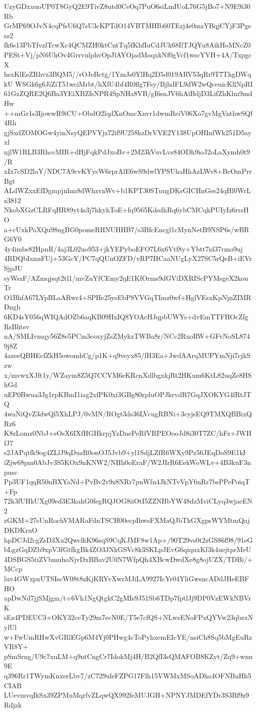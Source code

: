 UzyGDxuuoUP0T8GyQ2E9TivZ8utd0CeOq7PuO6siLmIUoL76G5jBo7+N9E9i30Rb
GrMP69OJvN4cqPfsU6Q7sU3cKPTdO14VBTMHIb60TEzj4e0mzYBqjCYjF3Pgesz2
fk6s13PbTfvzlTcwXc4QCMZH0ktCntTq5fKhfIuCdJUk68IlTJQYu8AikHoMNcZ0
PESt+Vj/pN6UhOv4GrrvulphvOpJlAYOjadMoqxkNf0gVcf1wscYVH+4A/TxpgcX
hsxKlEsZRhvz3BQM5//rOJeBctg/1YmJs0YlHq2D5d019ARV53qRr9T7ThgDWqkU
WSGk6g6JiZiT51wciMrbt/hXlU4bf4R0flg7Fsy/BjhdFL9dW2wQceuicKllNpRI
61GzZQRE2Q6Ba3YEiXBZfsNPR4SpNHa8VB/gI6snJV6hAiBdjD3LifZhKlm9mdHw
++mGr1s3IjowwR9iCU+ObdO2lqdXnOmcXnvr1dwmReiV06Xo7gvMgVnthwSQf4Rh
gjSxdZOMOGw4yinNsyQEPVYjz72if9U258kzDrVVE2Y138UpOHInfWk251D5ayxl
njlW1RLB3RhccMIR+dHjFqkPdJxoBv+2M23kVuvLvs84ODh9ioJ2oLaXymh0t9/R
xIx7cSD2laY/NDC7A9cvKYysW6rprAlE6wS9dwlYPSUhaHhAzLWv8+BcOmPrrBgt
ALdWZxxEfDgmpjnhm8dWhzvnWv+b1KPT30STuugDKsGICHnGes24qHl0WrLz3812
NkobXGzCLRFqHR89yt4s3j7hkyhToE+fq9565KdsdhRq6ybCMCqkPUIyIz6rrsHO
a+cUxkPoXQu98ngBG0pomeRHNUHHB7/s3BfcEncgl1cMynNetB9NSP6s/wBRG6Y0
4y4imbs82HpnR/4aj3L02uo953+jkYEPyboEFO7L6x6Vtf8y+Ybtt7id37rmo9uj
4RDQbIxnnFUj+53GcY/PC7qQUnOZFD/vRP7HCaaNUgLyX27SC5rQeB+iEVrSjpJU
syWszF/AZmqjsqt2tl1/mvZuYfCEmy2qE1KfOrms9dGViDXRIScPYMsgeX2kouTr
O1BhfA67LYpBLaARwr4+SPHe25ysEbP8VVGqTImz0wf+HglVEsxKpNjnZIMRDngh
6KD4sY056qWIQAdOZb6aqKB09HxIQ8YOAcHJqpbUWYs+dvEmTTFHOcZfgRsBhtsv
nA/SMLIvmqy56Z8e5PCm3coxyjZsZMykzTWBa8r/NCc2RxoRW+GFvNoSL8749j8Z
4azeeQBHEcfZkH5owomhCg/p1K+q9veyx85/fH3Ea+JwdAArqMUPYmNji7cjkSzw
x/mvwxXJft1y/WZaym8Z5Q7CCVM6eKRcnXdlbgxkjRt2HKum6KtL82uqZe8HShGd
uEP0Bwua3Jg1rpKBmI1iag2xfPK0xi3GBg80zpluOPJkrvdR7GqJXOKYG4fRtJTQ
4waNiQvZ3dwQl5XhLPJ/0vMN/ROgt3ds36LVcugRBNi+3cyjsEQ9TMXQBBixQRz6
K8zLomz0NbJ+sOsX6IXfHGHkrpjYzDnePeRfVRPEOooJd8i30T7ZC/hFz+JWHfJ7
s2JAPqtfk9og4ZLlJ9qDuzR0onOJ5Jvb9+yl1SdjLZfR6WXy9Pz56JEqDoS9E1kI
iZjw68pm0AbJv3S5KOx9nKNW2/NHh0oEraF/W2JIrR6EekWoWLv+4B3kuF3npusc
Pp3UF1qqR50nBXYaNd+PvBv2v9z8NRr7puWfn4JkNTvVpY6nRr7bsPPePoiqT+Fp
72k3fUHkUXg09ed3E3kahG0fegRQJOG8iiOtI5ZZNHbYW48dzMviCLyq3wjaeEN2
zGKM+27sUnRochVMARaFdnTSCH00ecpIhwsFXMaQJbTkGXgpsWYMtmQajDKDKruO
hpDCJd2cgZsD3Xu2QwclkK96sqS9CqKJMF8w1Ap+/90T29vs0t2zGS86f98/91eG
bLgzGqDZb9xpV3fGtfkgBk4ZO3JNkGSVc8k3SKLpJEvG6qiquxKf3k4uejtprMeU
4DSBGS5tiZVbmuhoNjvDxBBav2U0N7WfpQh4XBcwDwdXe8g8ojUZX/TDBi/+MCcp
luv4GWxpxUTSIscW08t8zKjKRYvXwrMJiLA9927IcYr04YliGwsncADdJHeEBFHO
apDwNd7jjSMjgm/t+6Vh1NgQtgkC2gMIs9J51Sb6TDp7fptlJj9DP0VzEWkNBVrK
sEz4PDEUC3+OKY32ceTy29m7ecN0E/T5e7cfQS+NLwsENoFPxQYVw23qbzxNylUl
w+FwUmRHwXvGRlEGp6M4Yj0PHwg4cToPyhxemEIcYE/nsiCh8Sq5bMgEuRzVR8Y+
pSmSrng/U9c7xuLM+q9ntCngCr7IdokMj4H/B2QfI3sQMAFOB8KZyt/Zq9+wnu9E
q396Rr1TWymKnxerLbv7/zC729uleFZPG17Flh15VWMxMSoADha4OFNBuHh5CIAB
LUevmvqIkSx39ZPMuMqrfvZLqwQX992feMUJGH+NPNYJMDEfYDr3S3Bf9z9Rdjzk
